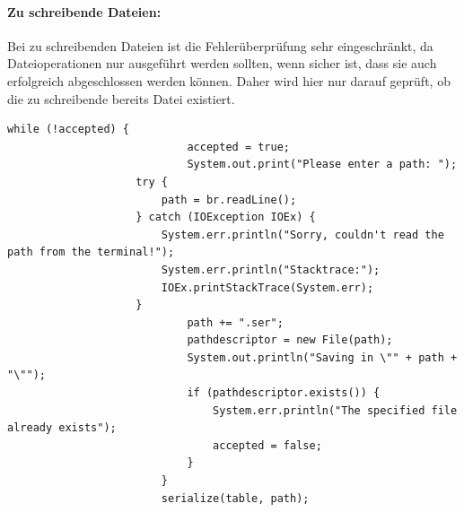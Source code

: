 \documentclass[11pt]{article}
\begin{document}
\begin{samepage}
  \paragraph{Zu schreibende Dateien:}
Bei zu schreibenden Dateien ist die Fehlerüberprüfung sehr eingeschränkt, da Dateioperationen nur ausgeführt werden sollten, wenn sicher ist, dass sie auch erfolgreich abgeschlossen werden können. Daher wird hier nur darauf geprüft, ob die zu schreibende bereits Datei existiert.
  \begin{lstlisting}[caption=Überprüfung eines Ausgabedateipfads, label=lst:OutputPathValidation]
                          while (!accepted) {
                            accepted = true;
                            System.out.print("Please enter a path: ");
                    try {
                        path = br.readLine();
                    } catch (IOException IOEx) {
                        System.err.println("Sorry, couldn't read the path from the terminal!");
                        System.err.println("Stacktrace:");
                        IOEx.printStackTrace(System.err);
                    }
                            path += ".ser";
                            pathdescriptor = new File(path);
                            System.out.println("Saving in \"" + path + "\"");
                            if (pathdescriptor.exists()) {
                                System.err.println("The specified file already exists");
                                accepted = false;
                            }
                        }
                        serialize(table, path);
  \end{lstlisting}
  \end{samepage}
  \pagebreak
\end{document}
